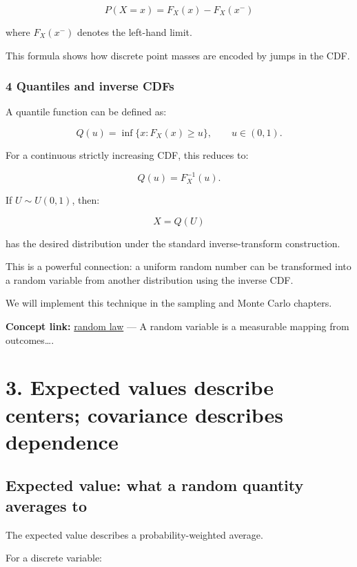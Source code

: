 \[
 \boxed{ P(X=x) = F_X(x)-F_X(x^-) }
\]

where \(F_X(x^-)\) denotes the left-hand limit.

This formula shows how discrete point masses are encoded by jumps in the CDF.

\subsubsection{4 Quantiles and inverse CDFs}\label{02-foundations-ii-ch023-quantiles-and-inverse-cdfs}

A quantile function can be defined as:

\[
 \boxed{ Q(u)=\inf\{x:F_X(x)\ge u\} }, \qquad u\in(0,1).
\]

For a continuous strictly increasing CDF, this reduces to:

\[
 Q(u)=F_X^{-1}(u).
\]

If \(U\sim U(0,1)\), then:

\[
 X=Q(U)
\]

has the desired distribution under the standard inverse-transform construction.

This is a powerful connection: a uniform random number can be transformed into a random variable from another distribution using the inverse CDF.

We will implement this technique in the sampling and Monte Carlo chapters.

\textbf{Concept link:} \hyperref[02-foundations-ii-ch023-random-quantities-and-their-probability-laws]{random law} --- A random variable is a measurable mapping from outcomes\ldots.

\section{3. Expected values describe centers; covariance describes dependence}\label{02-foundations-ii-ch023-expected-values-describe-centers-covariance-describes-dependence}

\subsection{Expected value: what a random quantity averages to}\label{02-foundations-ii-ch023-expected-value-what-a-random-quantity-averages-to}

The expected value describes a probability-weighted average.

For a discrete variable:

